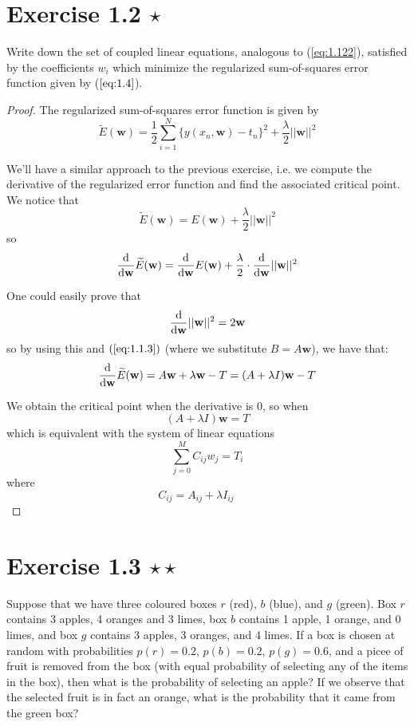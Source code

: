 \section*{Exercise 1.2 $\star$}
Write down the set of coupled linear equations, analogous to (\ref{eq:1.122}), satisfied
by the coefficients $w_i$ which minimize the regularized sum-of-squares error
function given by ($\ref{eq:1.4}$).
    
\vspace{1em}

\begin{proof}
    The regularized sum-of-squares error function is given by
    \begin{equation*}
        \widetilde{E}(\mathbf{w}) = \frac{1}{2} \sum_{i = 1}^N 
            \{y(x_n, \mathbf{w}) - t_n\}^2 + \frac{\lambda}{2} ||\mathbf{w}||^2
        \tag{1.4}\label{eq:1.4}
    \end{equation*}

    We'll have a similar approach to the previous exercise, i.e. we compute
    the derivative of the regularized error function and find the associated
    critical point. We notice that
    \[
        \widetilde{E}(\mathbf{w}) = E(\mathbf{w}) + \frac{\lambda}{2} ||\mathbf{w}||^2
    \] 
    so
    \[
        \dv{\mathbf{w}} \widetilde{E}(\mathbf{w}) 
        = \dv{\mathbf{w}} E(\mathbf{w}) + \frac{\lambda}{2} \cdot \dv{\mathbf{w}} ||\mathbf{w}||^2
    \] 

    One could easily prove that
    \[
        \dv{\mathbf{w}} ||\mathbf{w}||^2 = 2\mathbf{w}
    \] 
    so by using this and $(\ref{eq:1.1.3})$ (where we substitute $B = A\mathbf{w}$), we
    have that:
    \[
        \dv{\mathbf{w}} \widetilde{E}(\mathbf{w}) 
        = A\mathbf{w} + \lambda \mathbf{w} - T
        = (A + \lambda I)\mathbf{w} - T
    \] 

    We obtain the critical point when the derivative is 0, so when
    \[
        (A + \lambda I) \mathbf{w} = T
    \] 
    which is equivalent with the system of linear equations
    \[
        \sum_{j=0}^{M} C_{ij} w_j = T_i
    \] 
    where 
    \[
        C_{ij} = A_{ij} + \lambda I_{ij} \hspace{2em}
    \] 
\end{proof}

\section*{Exercise 1.3 $\star \star$}
Suppose that we have three coloured boxes $r$ (red), $b$ (blue), and $g$ (green). Box
$r$ contains 3 apples, 4 oranges and 3 limes, box $b$ contains 1 apple, 1 orange, and 0
limes, and box $g$ contains 3 apples, 3 oranges, and 4 limes. If a box is chosen
at random with probabilities $p(r) = 0.2$, $p(b) = 0.2$, $p(g) = 0.6$, and a picee 
of fruit is removed from the box (with equal probability of selecting any of the items
in the box), then what is the probability of selecting an apple? If we observe
that the selected fruit is in fact an orange, what is the probability that it came from
the green box?

